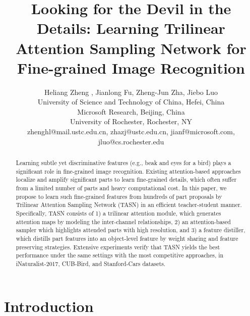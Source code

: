 \documentclass[10pt,twocolumn,letterpaper]{article}
\begin{document}
\vspace{-5 mm}
\title{Looking for the Devil in the Details: Learning Trilinear Attention Sampling Network for Fine-grained Image Recognition}

\author{Heliang Zheng  , Jianlong Fu, Zheng-Jun Zha, Jiebo Luo \\ \small University of Science and Technology of China, Hefei, China
\\ \small Microsoft Research, Beijing, China
\\ \small University of Rochester, Rochester, NY
\\ \small zhenghl@mail.ustc.edu.cn, zhazj@ustc.edu.cn, jianf@microsoft.com, jluo@cs.rochester.edu}


\maketitle
\thispagestyle{empty}
\vspace{-3 mm}
\begin{abstract}
Learning subtle yet discriminative features (e.g., beak and eyes for a bird) plays a significant role in fine-grained image recognition. Existing attention-based approaches localize and amplify significant parts to learn fine-grained details, which often suffer from a limited number of parts and heavy computational cost. In this paper, we propose to learn such fine-grained features from hundreds of part proposals by Trilinear Attention Sampling Network (TASN) in an efficient teacher-student manner. Specifically, TASN consists of 1) a trilinear attention module, which generates attention maps by modeling the inter-channel relationships, 2) an attention-based sampler which highlights attended parts with high resolution, and 3) a feature distiller, which distills part features into an object-level feature by weight sharing and feature preserving strategies. Extensive experiments verify that TASN yields the best performance under the same settings with the most competitive approaches, in iNaturalist-2017, CUB-Bird, and Stanford-Cars datasets. 






\end{abstract}


\vspace{-3 mm}
\section{Introduction}
\end{document}
